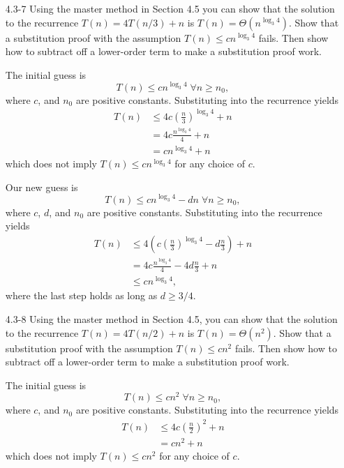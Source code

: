 \documentclass{report}
\makeatletter
\renewenvironment{framed}{%
 \def\FrameCommand##1{\hskip\@totalleftmargin
 \fboxsep=\FrameSep\fbox{##1}}%
 \MakeFramed {\advance\hsize-\width
   \@totalleftmargin\z@ \linewidth\hsize
   \@setminipage}}%
 {\par\unskip\endMakeFramed}
\DeclareMathOperator{\Forall}{\forall}
\makeatother
\begin{document}
\begin{enumerate}
\item[4.3{-}7]{Using the master method in Section 4.5 you can show that the
solution to the recurrence $T(n) = 4T(n/3) + n$ is
$T(n) = \Theta(n^{\log_3 4})$. Show that a substitution proof with the
assumption $T(n) \le c n^{\log_3 4}$ fails. Then show how to subtract off a
lower-order term to make a substitution proof work.}

\begin{framed}
The initial guess is
\[
T(n) \le c n^{\log_3 4} \; \Forall n \ge n_0,
\]
where $c$, and $n_0$ are positive constants. Substituting into the
recurrence yields
\begin{equation*}
\begin{aligned}
T(n) &\le 4 c \left(\frac{n}{3}\right)^{\log_3 4} + n\\
     &= 4 c \frac{n^{\log_3 4}}{4} + n\\
     &= c n^{\log_3 4} + n
\end{aligned}
\end{equation*}
which does not imply $T(n) \le c n^{\log_3 4}$ for any choice of $c$.

Our new guess is
\[
T(n) \le c n^{\log_3 4} - dn \; \Forall n \ge n_0,
\]
where $c$, $d$, and $n_0$ are positive constants. Substituting into the
recurrence yields
\begin{equation*}
\begin{aligned}
T(n) &\le 4 \left(c \left(\frac{n}{3}\right)^{\log_3 4} - d \frac{n}{3}\right) + n\\
     &= 4 c \frac{n^{\log_3 4}}{4} - 4d \frac{n}{3} + n\\
     &\le c n^{\log_3 4},
\end{aligned}
\end{equation*}
where the last step holds as long as $d \ge 3/4$.
\end{framed}

\item[4.3{-}8]{Using the master method in Section 4.5, you can show that the
solution to the recurrence $T(n) = 4T(n/2) + n$ is $T(n) = \Theta(n^2)$. Show
that a substitution proof with the assumption $T(n) \le cn^2$ fails. Then show
how to subtract off a lower-order term to make a substitution proof work.}

\begin{framed}
The initial guess is
\[
T(n) \le c n^2 \; \Forall n \ge n_0,
\]
where $c$, and $n_0$ are positive constants. Substituting into the
recurrence yields
\begin{equation*}
\begin{aligned}
T(n) &\le 4 c \left(\frac{n}{2}\right)^2 + n\\
     &= c n^2 + n
\end{aligned}
\end{equation*}
which does not imply $T(n) \le c n^2$ for any choice of $c$.


\end{framed}
\end{enumerate}
\end{document}

